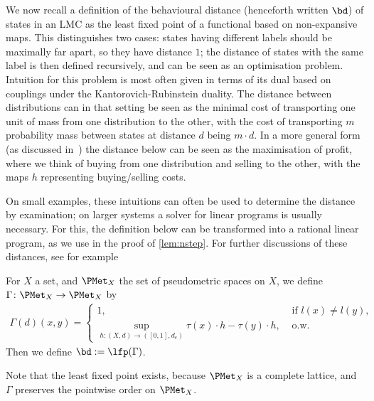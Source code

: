 We now recall a definition of the behavioural distance (henceforth written \(\bd\)) of states in an LMC as the least fixed point of a functional based on non-expansive maps.
This distinguishes two cases:
states having different labels should be maximally far apart, so they have distance \(1\);
the distance of states with the same label is then defined recursively, and can be seen as an optimisation problem.
Intuition for this problem is most often given in terms of its dual based on couplings under the Kantorovich-Rubinstein duality. The distance between distributions can in that setting be seen as the minimal cost of transporting one unit of mass from one distribution to the other, with the cost of transporting \(m\) probability mass between states at distance \(d\) being \(m \cdot d\).
In a more general form (as discussed in~\cite{villani2008optimal}) the distance below can be seen as the maximisation of profit, where we think of buying from one distribution and selling to the other, with the maps \(h\) representing buying/selling costs.

On small examples, these intuitions can often be used to determine the distance by examination; on larger systems a solver for linear programs is usually necessary.
For this, the definition below can be transformed into a rational linear program, as we use in the proof of \cref{lem:nstep}.
For further discussions of these distances, see for example~\cite{DBLP:journals/siglog/Breugel17, DBLP:conf/fossacs/RadyB23} %
\begin{definition}
	For \(X\) a set, and \(\PMet_X\) the set of pseudometric spaces on \(X\), we define \(\Gamma \colon \PMet_X \to \PMet_X\) by
	\begin{align*}
		\Gamma(d)(x,y) = \begin{cases}
			                 1,                                                                           & \text{ if } l(x) \neq l(y), \\
			                 \sup_{h \colon (X,d) \to ([0,1],d_e)} \tau(x) \cdot h - \tau(y) \cdot h, & \text{ o.w.}
		                 \end{cases}
	\end{align*}
	Then we define \(\bd := \lfp(\Gamma)\).
\end{definition}
Note that the least fixed point exists, because \(\PMet_X\) is a complete lattice, and \(\Gamma\) preserves the pointwise order on \(\PMet_X\).

